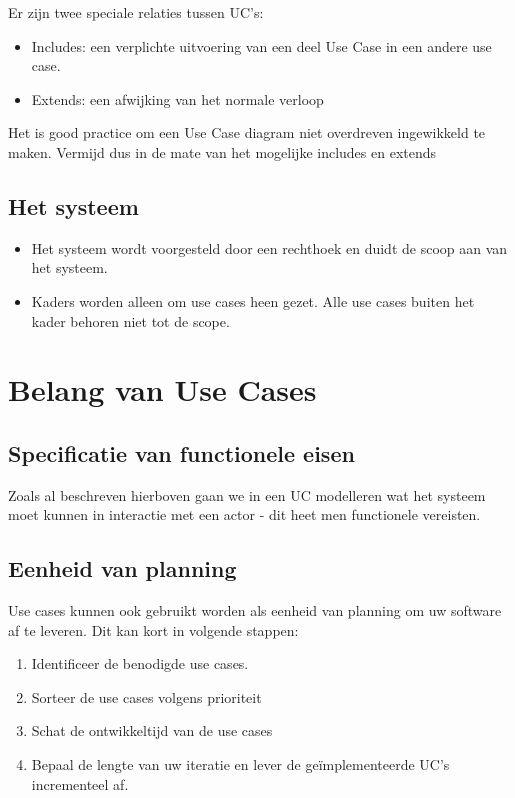Er zijn twee speciale relaties tussen UC's:
\begin{itemize}
	\item Includes: een verplichte uitvoering van een deel Use Case in een andere use case.
	\item Extends: een afwijking van het normale verloop
\end{itemize}

Het is good practice om een Use Case diagram niet overdreven ingewikkeld te maken. Vermijd dus in de mate van het mogelijke includes en extends

\subsection{Het systeem}
\begin{itemize}
	\item Het systeem wordt voorgesteld door een rechthoek en duidt de scoop aan van het systeem. 
	\item Kaders worden alleen om use cases heen gezet. Alle use cases buiten het kader behoren niet tot de scope.
\end{itemize}

\section{Belang van Use Cases}

\subsection{Specificatie van functionele eisen}
Zoals al beschreven hierboven gaan we in een UC modelleren wat het systeem moet kunnen in interactie met een actor - dit heet men functionele vereisten.

\subsection{Eenheid van planning}
Use cases kunnen ook gebruikt worden als eenheid van planning om uw software af te leveren. Dit kan kort in volgende stappen:
\begin{enumerate}
	\item Identificeer de benodigde use cases.
	\item Sorteer de use cases volgens prioriteit
	\item Schat de ontwikkeltijd van de use cases
	\item Bepaal de lengte van uw iteratie en lever de ge\"implementeerde UC's incrementeel af.
\end{enumerate}

